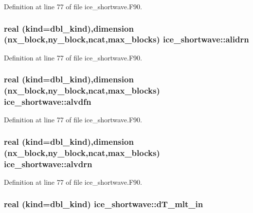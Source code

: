 Definition at line 77 of file ice\_\-shortwave.F90.\hypertarget{namespaceice__shortwave_ad5fc075ea048baae3a2fec2c1cf5233d}{
\subsubsection[{alidrn}]{\setlength{\rightskip}{0pt plus 5cm}real (kind=dbl\_\-kind),dimension (nx\_\-block,ny\_\-block,ncat,max\_\-blocks) {\bf ice\_\-shortwave::alidrn}}}
\label{namespaceice__shortwave_ad5fc075ea048baae3a2fec2c1cf5233d}


Definition at line 77 of file ice\_\-shortwave.F90.\hypertarget{namespaceice__shortwave_ac6d77b12a1e61fb0b9d1e9639f3ee6ec}{
\subsubsection[{alvdfn}]{\setlength{\rightskip}{0pt plus 5cm}real (kind=dbl\_\-kind),dimension (nx\_\-block,ny\_\-block,ncat,max\_\-blocks) {\bf ice\_\-shortwave::alvdfn}}}
\label{namespaceice__shortwave_ac6d77b12a1e61fb0b9d1e9639f3ee6ec}


Definition at line 77 of file ice\_\-shortwave.F90.\hypertarget{namespaceice__shortwave_a2230448dab2863bca3e1997a89f3412d}{
\subsubsection[{alvdrn}]{\setlength{\rightskip}{0pt plus 5cm}real (kind=dbl\_\-kind),dimension (nx\_\-block,ny\_\-block,ncat,max\_\-blocks) {\bf ice\_\-shortwave::alvdrn}}}
\label{namespaceice__shortwave_a2230448dab2863bca3e1997a89f3412d}


Definition at line 77 of file ice\_\-shortwave.F90.\hypertarget{namespaceice__shortwave_a893d8a9d70334a9f7b5743e91d37cf92}{
\subsubsection[{dT\_\-mlt\_\-in}]{\setlength{\rightskip}{0pt plus 5cm}real (kind=dbl\_\-kind) {\bf ice\_\-shortwave::dT\_\-mlt\_\-in}}}
\label{namespaceice__shortwave_a893d8a9d70334a9f7b5743e91d37cf92}


